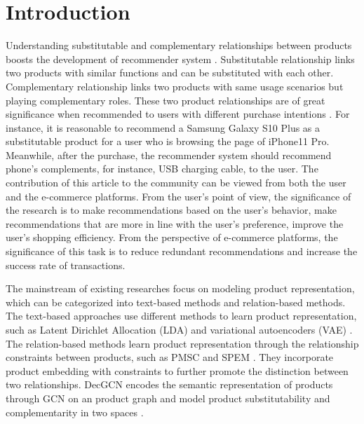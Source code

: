 \documentclass[review]{elsarticle}
\begin{document}
\begin{sloppypar}
\begin{frontmatter}
\end{frontmatter}


\section{Introduction}
Understanding substitutable and complementary relationships between products boosts the development of recommender system \cite{tintarev2007survey_UserSatisfaction,zhang2016collaborative_KGEmbedding,huang2018improving_RS,newadd1,newadd2}.
Substitutable relationship links two products with similar functions and can be substituted with each other. 
Complementary relationship links two products with same usage scenarios but playing complementary roles. 
These two product relationships are of great significance when recommended to users with different purchase intentions \cite{wu2017session_PurchaseIntension}.
For instance, it is reasonable to recommend a Samsung Galaxy S10 Plus as a substitutable product for a user who is browsing the page of iPhone11 Pro.
Meanwhile, after the purchase, the recommender system should recommend phone's complements, for instance, USB charging cable, to the user.
The contribution of this article to the community can be viewed from both the user and the e-commerce platforms. From the user's point of view, the significance of the research is to make recommendations based on the user's behavior, make recommendations that are more in line with the user's preference, improve the user's shopping efficiency. From the perspective of e-commerce platforms, the significance of this task is to reduce redundant recommendations and increase the success rate of transactions. 

The mainstream of existing researches focus on modeling product representation, which can be categorized into text-based methods and relation-based methods. The text-based approaches use different methods to learn product representation, such as Latent Dirichlet Allocation (LDA) \cite{blei2003latentLDA} and variational autoencoders (VAE) \cite{rakesh2019LVAE}. The relation-based methods learn product representation through the relationship constraints between products, such as PMSC \cite{DBLP:conf/wsdm/WangJRTY18_JD} and SPEM \cite{zhang2019inferring_SPEM}. They incorporate product embedding with constraints to further promote the distinction between two relationships. DecGCN encodes the semantic representation of products through GCN on an product graph and model product substitutability and complementarity in two spaces \cite{cikm2020}.


\end{sloppypar}
\end{document}
